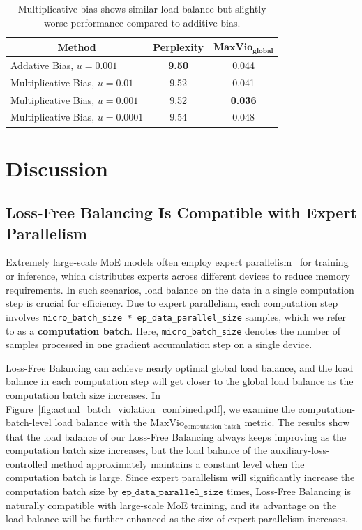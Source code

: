 \documentclass{article}
\newcommand{\ours}{Loss-Free Balancing}
\newcommand{\Ours}{Loss-Free Balancing}
\newcommand{\OURS}{Loss-Free Balancing}
\begin{document}
\begin{table}[t]
\caption{Multiplicative bias shows similar load balance but slightly worse performance compared to additive bias.}
\label{tab:multiplicative bias}
\begin{center}
\begin{tabular}{l|c|c}
\toprule
\multicolumn{1}{c|}{\textbf{Method}} & \textbf{Perplexity} & $\textbf{MaxVio}_\textbf{global}$ \\
\midrule
Addative Bias, $u=0.001$ & \textbf{9.50} & 0.044 \\
Multiplicative Bias, $u=0.01$ & 9.52 & 0.041 \\ 
Multiplicative Bias, $u=0.001$ &  9.52 & \textbf{0.036} \\
Multiplicative Bias, $u=0.0001$ & 9.54  & 0.048 \\
\bottomrule
\end{tabular}
\end{center}
\end{table}

\section{Discussion}
\subsection{\OURS{} Is Compatible with Expert Parallelism}
\label{subsec:load_balance_micro_batch}
Extremely large-scale MoE models often employ expert parallelism~\citep{Lepikhin2020GShardSG} for training or inference, which distributes experts across different devices to reduce memory requirements. 
In such scenarios, load balance on the data in a single computation step is crucial for efficiency. 
Due to expert parallelism, each computation step involves \texttt{micro\_batch\_size * ep\_data\_parallel\_size} samples, which we refer to as a \textbf{computation batch}. 
Here, \texttt{micro\_batch\_size} denotes the number of samples processed in one gradient accumulation step on a single device.

\Ours{} can achieve nearly optimal global load balance, and the load balance in each computation step will get closer to the global load balance as the computation batch size increases. 
In Figure~\ref{fig:actual_batch_violation_combined.pdf}, we examine the computation-batch-level load balance with the $\text{MaxVio}_\text{computation-batch}$ metric. 
The results show that the load balance of our \ours{} always keeps improving as the computation batch size increases, but the load balance of the auxiliary-loss-controlled method approximately maintains a constant level when the computation batch is large.
Since expert parallelism will significantly increase the computation batch size by $\texttt{ep\_data\_parallel\_size}$ times, \ours{} is naturally compatible with large-scale MoE training, and its advantage on the load balance will be further enhanced as the size of expert parallelism increases.
\end{document}
